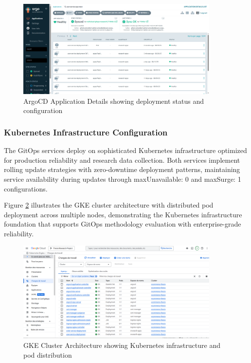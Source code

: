 \begin{figure}[H]
\centering
\includegraphics[width=0.9\textwidth]{figures/chapter4/argocd-application-details.png}
\caption{ArgoCD Application Details showing deployment status and configuration}
\label{fig:argocd-application-details}
\end{figure}

\subsubsection{Kubernetes Infrastructure Configuration}

The GitOps services deploy on sophisticated Kubernetes infrastructure optimized for production reliability and research data collection. Both services implement rolling update strategies with zero-downtime deployment patterns, maintaining service availability during updates through maxUnavailable: 0 and maxSurge: 1 configurations.

Figure \ref{fig:gke-cluster-architecture} illustrates the GKE cluster architecture with distributed pod deployment across multiple nodes, demonstrating the Kubernetes infrastructure foundation that supports GitOps methodology evaluation with enterprise-grade reliability.

\begin{figure}[H]
\centering
\includegraphics[width=0.9\textwidth]{figures/chapter4/gke-cluster-architecture.png}
\caption{GKE Cluster Architecture showing Kubernetes infrastructure and pod distribution}
\label{fig:gke-cluster-architecture}
\end{figure}

